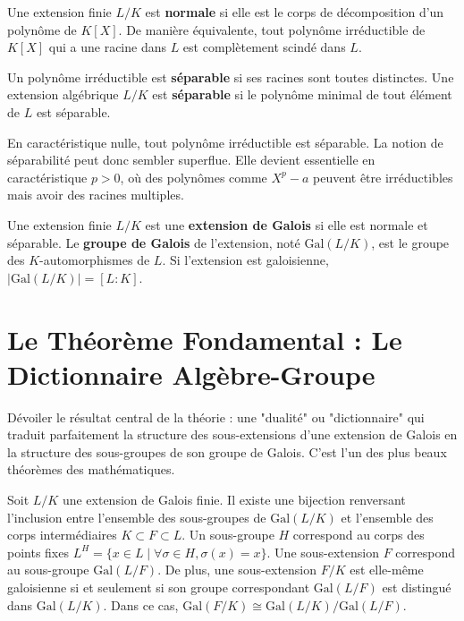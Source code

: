 \begin{definition}
    Une extension finie $L/K$ est \textbf{normale} si elle est le corps de décomposition d'un polynôme de $K[X]$. De manière équivalente, tout polynôme irréductible de $K[X]$ qui a une racine dans $L$ est complètement scindé dans $L$.
\end{definition}

\begin{definition}
    Un polynôme irréductible est \textbf{séparable} si ses racines sont toutes distinctes. Une extension algébrique $L/K$ est \textbf{séparable} si le polynôme minimal de tout élément de $L$ est séparable.
\end{definition}

\begin{remark}
    En caractéristique nulle, tout polynôme irréductible est séparable. La notion de séparabilité peut donc sembler superflue. Elle devient essentielle en caractéristique $p>0$, où des polynômes comme $X^p - a$ peuvent être irréductibles mais avoir des racines multiples.
\end{remark}

\begin{definition}
    Une extension finie $L/K$ est une \textbf{extension de Galois} si elle est normale et séparable.
    Le \textbf{groupe de Galois} de l'extension, noté $\mathrm{Gal}(L/K)$, est le groupe des $K$-automorphismes de $L$. Si l'extension est galoisienne, $|\mathrm{Gal}(L/K)| = [L:K]$.
\end{definition}

\section{Le Théorème Fondamental : Le Dictionnaire Algèbre-Groupe}

\begin{objectif}
    Dévoiler le résultat central de la théorie : une "dualité" ou "dictionnaire" qui traduit parfaitement la structure des sous-extensions d'une extension de Galois en la structure des sous-groupes de son groupe de Galois. C'est l'un des plus beaux théorèmes des mathématiques.
\end{objectif}

\begin{theorem}
    Soit $L/K$ une extension de Galois finie. Il existe une bijection renversant l'inclusion entre l'ensemble des sous-groupes de $\mathrm{Gal}(L/K)$ et l'ensemble des corps intermédiaires $K \subset F \subset L$.
    Un sous-groupe $H$ correspond au corps des points fixes $L^H = \{x \in L \mid \forall \sigma \in H, \sigma(x)=x\}$.
    Une sous-extension $F$ correspond au sous-groupe $\mathrm{Gal}(L/F)$.
    De plus, une sous-extension $F/K$ est elle-même galoisienne si et seulement si son groupe correspondant $\mathrm{Gal}(L/F)$ est distingué dans $\mathrm{Gal}(L/K)$. Dans ce cas, $\mathrm{Gal}(F/K) \cong \mathrm{Gal}(L/K)/\mathrm{Gal}(L/F)$.
\end{theorem}

